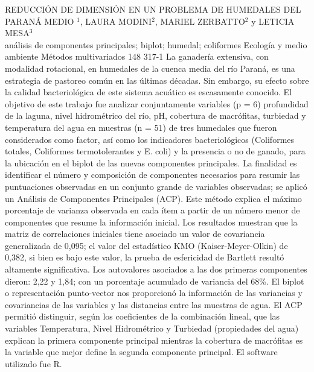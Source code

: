 \A
{REDUCCIÓN DE DIMENSIÓN EN UN PROBLEMA DE HUMEDALES DEL PARANÁ MEDIO}
{$^1$, LAURA MODINI$^2$, MARIEL ZERBATTO$^2$ y LETICIA MESA$^3$}
{
\\}
{análisis de componentes principales; biplot; humedal; coliformes} 
 {Ecología y medio ambiente} 
 {Métodos multivariados} 
 {148} 
 {317-1}
{La ganadería extensiva, con modalidad rotacional, en humedales de la cuenca media del río Paraná, es una estrategia de pastoreo común en las últimas décadas. Sin embargo, su efecto sobre la calidad bacteriológica de este sistema acuático es escasamente conocido. El objetivo de este trabajo fue analizar conjuntamente variables (p = 6) profundidad de la laguna, nivel hidrométrico del río, pH, cobertura de macrófitas, turbiedad y temperatura del agua en muestras (n = 51) de tres humedales que fueron considerados como factor, así como los indicadores bacteriológicos (Coliformes totales, Coliformes termotolerantes y E. coli) y la presencia o no de ganado, para la ubicación en el biplot de las nuevas componentes principales. La finalidad es identificar el número y composición de componentes necesarios para resumir las puntuaciones observadas en un conjunto grande de variables observadas; se aplicó un Análisis de Componentes Principales (ACP). Este método explica el máximo porcentaje de varianza observada en cada ítem a partir de un número menor de componentes que resume la información inicial. Los resultados muestran que la matriz de correlaciones iniciales tiene asociado un valor de covariancia generalizada de 0,095; el valor del estadístico KMO (Kaiser-Meyer-Olkin) de 0,382, si bien es bajo este valor, la prueba de esfericidad de Bartlett resultó altamente significativa. Los autovalores asociados a las dos primeras componentes dieron: 2,22 y 1,84; con un porcentaje acumulado de variancia del 68\%. El biplot o representación punto-vector nos proporcionó la información de las variancias y covariancias de las variables y las distancias entre las muestras de agua. El ACP permitió distinguir, según los coeficientes de la combinación lineal, que las variables Temperatura, Nivel Hidrométrico y Turbiedad (propiedades del agua) explican la primera componente principal mientras la cobertura de macrófitas es la variable que mejor define la segunda componente principal. El software utilizado fue R. }
